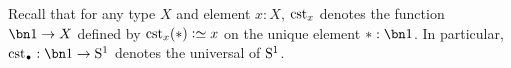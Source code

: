 


Recall that for any type $X$ and element $x:X$, $\cst x$ denotes the
function $\bn 1\to X$ defined by $\cst x (\ast) \defequi x$ on the
unique element $\ast: \bn 1$. In particular,
$\cst \base : \bn 1 \to \Sc$ denotes the universal \covering of ${\mathrm{S}^1}$.

